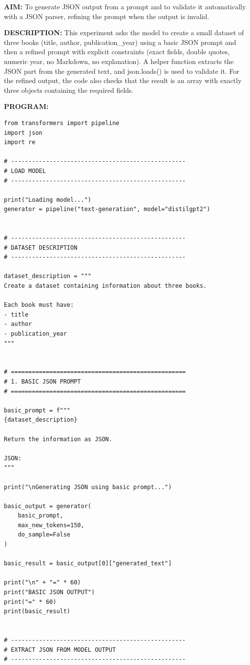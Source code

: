 \documentclass[10pt,a4paper]{article}
\newcommand{\code}[1]{{\ttfamily\hyphenchar\font=-1 #1}}
\newcommand{\sectionlabel}[1]{\par\vspace{3pt}\noindent\textbf{#1}\par\nopagebreak}
\begin{document}
\noindent\textbf{AIM:} To generate JSON output from a prompt and to validate it automatically with a JSON parser, refining the prompt when the output is invalid.

\noindent\textbf{DESCRIPTION:} This experiment asks the model to create a small dataset of three books (title, author, publication\_year) using a basic JSON prompt and then a refined prompt with explicit constraints (exact fields, double quotes, numeric year, no Markdown, no explanation). A helper function extracts the JSON part from the generated text, and \code{json.loads()} is used to validate it. For the refined output, the code also checks that the result is an array with exactly three objects containing the required fields.

\sectionlabel{PROGRAM:}
\begin{lstlisting}[style=code]
from transformers import pipeline
import json
import re

# --------------------------------------------------
# LOAD MODEL
# --------------------------------------------------

print("Loading model...")
generator = pipeline("text-generation", model="distilgpt2")


# --------------------------------------------------
# DATASET DESCRIPTION
# --------------------------------------------------

dataset_description = """
Create a dataset containing information about three books.

Each book must have:
- title
- author
- publication_year
"""


# ==================================================
# 1. BASIC JSON PROMPT
# ==================================================

basic_prompt = f"""
{dataset_description}

Return the information as JSON.

JSON:
"""

print("\nGenerating JSON using basic prompt...")

basic_output = generator(
    basic_prompt,
    max_new_tokens=150,
    do_sample=False
)

basic_result = basic_output[0]["generated_text"]

print("\n" + "=" * 60)
print("BASIC JSON OUTPUT")
print("=" * 60)
print(basic_result)


# --------------------------------------------------
# EXTRACT JSON FROM MODEL OUTPUT
# --------------------------------------------------


\end{lstlisting}
\end{document}
